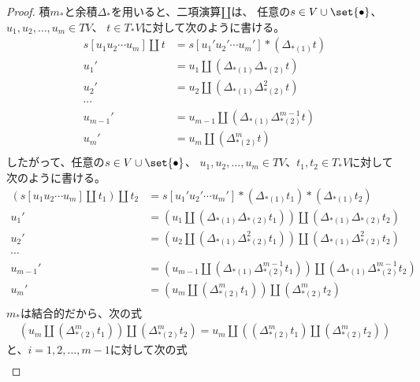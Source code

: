 \begin{proof}
		積$m_*$と余積$\Delta_*$を用いると、二項演算$\amalg$は、
		任意の$s\in V\cup\set{\bullet}$、$u_1,u_2,\dots,u_m\in TV$、
		$t\in T_*V$に対して次のように書ける。
		\begin{equation}\begin{split} %
			s[u_1u_2\cdots u_m]\amalg t
			&= s[u_1'u_2'\cdots u_m']*(\Delta_{*(1)}t) \\
			u_1' &= u_1\amalg (\Delta_{*(1)}\Delta_{*(2)}t) \\
			u_2' &= u_2\amalg (\Delta_{*(1)}\Delta_{*(2)}^2t) \\
			\cdots \\
			u_{m-1}' &= u_{m-1}\amalg (\Delta_{*(1)}\Delta_{*(2)}^{m-1}t) \\
			u_m' &= u_m\amalg (\Delta_{*(2)}^mt) \\
		\end{split}\end{equation} %
		したがって、任意の$s\in V\cup\set{\bullet}$、
		$u_1,u_2,\dots,u_m\in TV$、$t_1,t_2\in T_*V$に対して次のように書ける。
		\begin{equation}\label{eq:再帰その一}\begin{split} %
			(s[u_1u_2\cdots u_m]\amalg t_1)\amalg t_2
			&= s[u_1'u_2'\cdots u_m']*(\Delta_{*(1)}t_1)*(\Delta_{*(1)}t_2) \\
			u_1' &= \left(u_1\amalg (\Delta_{*(1)}\Delta_{*(2)}t_1)\right)\amalg (\Delta_{*(1)}\Delta_{*(2)}t_2) \\
			u_2' &= \left(u_2\amalg (\Delta_{*(1)}\Delta_{*(2)}^2t_1)\right)\amalg (\Delta_{*(1)}\Delta_{*(2)}^2t_2) \\
			\cdots \\
			u_{m-1}' &= \left(u_{m-1}\amalg (\Delta_{*(1)}\Delta_{*(2)}^{m-1}t_1)\right)\amalg (\Delta_{*(1)}\Delta_{*(2)}^{m-1}t_2) \\
			u_m' &= \left(u_m\amalg (\Delta_{*(2)}^mt_1)\right)\amalg (\Delta_{*(2)}^mt_2) \\
		\end{split}\end{equation} %
		$m_*$は結合的だから、次の式
		\begin{equation}\label{eq:再帰その二}\begin{split} %
			\left(u_m\amalg (\Delta_{*(2)}^mt_1)\right)\amalg (\Delta_{*(2)}^mt_2)
			= u_m\amalg \left((\Delta_{*(2)}^mt_1)\amalg (\Delta_{*(2)}^mt_2)\right)
		\end{split}\end{equation} %
		と、$i=1,2,\dots,m-1$に対して次の式
		\begin{equation}\label{eq:再帰その三}\begin{split} %

\end{split}
\end{equation}
\end{proof}

